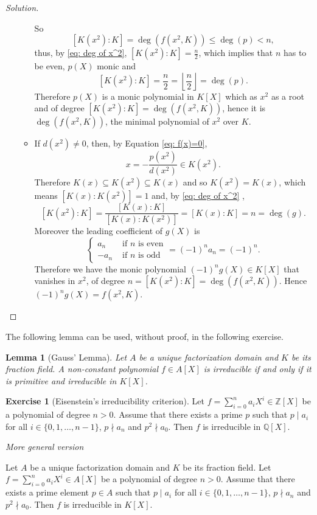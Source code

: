 \documentclass[a4paper,10pt,reqno]{amsart}
\newcommand{\Z}{\mathbb{Z}}
\newcommand{\Q}{\mathbb{Q}}
\newtheorem*{lem*}{Lemma}
\theoremstyle{definition} %
\newtheorem{ex}{Exercise}[section]
\newenvironment{sol}
  {\renewcommand\qedsymbol{$\blacksquare$}\begin{proof}[Solution]}
  {\end{proof}}
\begin{document}
\begin{sol}
\begin{enumerate}[label=(\roman*)]
\begin{itemize}
        So 
        \[
        [K(x^2):K]=\deg(f(x^2,K))\leq \deg(p)< n,
        \]
        thus, by \eqref{eq: deg of x^2}, $[K(x^2):K]=\frac{n}{2}$, which implies that $n$ has to be even, $p(X)$ monic and 
        \[
        [K(x^2):K]=\frac{n}{2}=\left\lfloor \frac{n}{2}\right\rfloor=\deg(p).
        \]
        Therefore $p(X)$ is a monic polynomial in $K[X]$
        which as $x^2$ as a root and of degree $[K(x^2):K]=\deg(f(x^2,K))$,
        hence it is $\deg(f(x^2,K))$,
        the minimal polynomial of $x^2$ over $K$.
        \item If $d(x^2)\neq0$, then, by Equation \eqref{eq: f(x)=0}, 
        \[
        x=-\frac{p(x^2)}{d(x^2)}\in K(x^2).
        \]
        Therefore $K(x)\subseteq K(x^2)\subseteq K(x)$ and so $K(x^2)=K(x)$,
        which means $[K(x):K(x^2)]=1$ and, by \eqref{eq: deg of x^2} ,
        \[
        [K(x^2):K]=\frac{[K(x):K]}{[K(x):K(x^2)]}=[K(x):K]=n=\deg(g).
        \]
        Moreover the leading coefficient of $g(X)$ is
        \[
        \begin{cases}
        a_n &\text{ if }n\text{ is even}\\
        -a_n&\text{ if }n\text{ is odd}
        \end{cases}=(-1)^na_n=(-1)^n .
        \]
        Therefore we have the monic polynomial  
        $(-1)^ng(X)\in K[X]$ that vanishes in $x^2$,
        of degree $n=[K(x^2):K]=\deg(f(x^2,K))$. Hence $(-1)^ng(X)=f(x^2,K)$.
    \end{itemize}
    \end{enumerate}
\end{sol}



The following lemma can be used, without proof, in the following exercise.

\begin{lem*}[Gauss' Lemma]
    Let $A$ be a unique factorization domain and $K$ be its fraction field.
    A non-constant polynomial $f\in A[X]$ is irreducible if and only if it is primitive and irreducible in $K[X]$.
\end{lem*}

\begin{ex} [Eisenstein's irreducibility criterion]
    Let $f=\sum_{i=0}^n a_iX^i\in \Z[X]$ be a polynomial of degree $n>0$. 
    Assume that there exists a prime $p$ such that
    $p\mid a_i$ for all $i\in\{0,1,\dots,n-1\}$, $p\nmid a_n$ and
    $p^2\nmid a_0$. Then $f$ is irreducible in $\Q[X]$.

    \vspace{.5cm}
    
    \textit{More general version}
    
    Let $A$ be a unique factorization domain and $K$ be its fraction field.
    Let $f=\sum_{i=0}^n a_iX^i\in A[X]$ be a polynomial of degree $n>0$. 
    Assume that there exists a prime element $p\in A$ such that
    $p\mid a_i$ for all $i\in\{0,1,\dots,n-1\}$, $p\nmid a_n$ and
    $p^2\nmid a_0$. Then $f$ is irreducible in $K[X]$. 
\end{ex}
\end{document}
